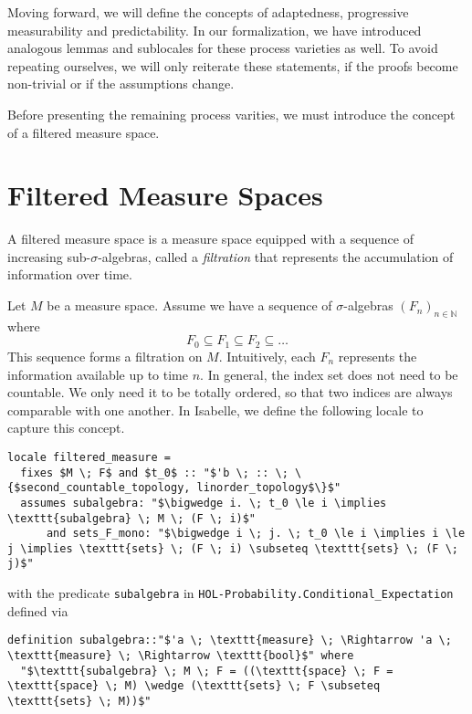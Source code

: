 \begin{remark}
Moving forward, we will define the concepts of adaptedness, progressive measurability and predictability. In our formalization, we have introduced analogous lemmas and sublocales for these process varieties as well. To avoid repeating ourselves, we will only reiterate these statements, if the proofs become non-trivial or if the assumptions change.
\end{remark}

Before presenting the remaining process varities, we must introduce the concept of a filtered measure space.

\section{Filtered Measure Spaces}

A filtered measure space is a measure space equipped with a sequence of increasing sub-$\sigma$-algebras, called a \textit{filtration} that represents the accumulation of information over time.

Let $M$ be a measure space. Assume we have a sequence of $\sigma$-algebras $(F_n)_{n \in \mathbb{N}}$ where 
\[
	F_0 \subseteq F_1 \subseteq F_2 \subseteq \dots
\]
This sequence forms a filtration on $M$. Intuitively, each $F_n$ represents the information available up to time $n$. In general, the index set does not need to be countable. We only need it to be totally ordered, so that two indices are always comparable with one another. In Isabelle, we define the following locale to capture this concept.

\begin{isadefinition}
{\small
\begin{lstlisting}[style=isabelle]
locale filtered_measure = 
  fixes $M \; F$ and $t_0$ :: "$'b \; :: \; \{$second_countable_topology, linorder_topology$\}$"
  assumes subalgebra: "$\bigwedge i. \; t_0 \le i \implies \texttt{subalgebra} \; M \; (F \; i)$"
      and sets_F_mono: "$\bigwedge i \; j. \; t_0 \le i \implies i \le j \implies \texttt{sets} \; (F \; i) \subseteq \texttt{sets} \; (F \; j)$"
\end{lstlisting}

with the predicate \texttt{subalgebra} in \texttt{HOL-Probability.Conditional\_Expectation} defined via

\begin{lstlisting}[style=isabelle]
definition subalgebra::"$'a \; \texttt{measure} \; \Rightarrow 'a \; \texttt{measure} \; \Rightarrow \texttt{bool}$" where
  "$\texttt{subalgebra} \; M \; F = ((\texttt{space} \; F = \texttt{space} \; M) \wedge (\texttt{sets} \; F \subseteq \texttt{sets} \; M))$"
  \end{lstlisting}
}
\end{isadefinition}


